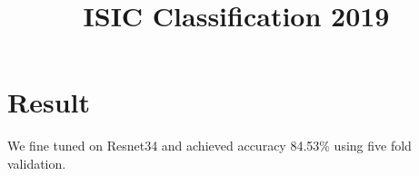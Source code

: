 \documentclass{article}
\title{ISIC Classification 2019}
\author{}
\begin{document}
\maketitle

\section{Result}

We fine tuned on Resnet34 and achieved accuracy 84.53\% using five fold validation.
\end{document}
